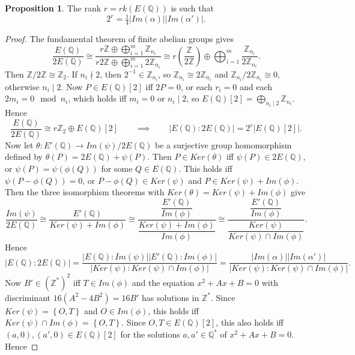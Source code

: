 \documentclass{article}
\newcommand{\Z}{\mathbb{Z}}
\newcommand{\Q}{\mathbb{Q}}
\newcommand{\rb}[1]{\left( #1 \right)}
\renewcommand{\sb}[1]{\left[ #1 \right]}
\newcommand{\cb}[1]{\left\{ #1 \right\}}
\newcommand{\abs}[1]{\left\lvert #1 \right\rvert}
\theoremstyle{definition}\newtheorem*{definition}{Definition}
\theoremstyle{definition}\newtheorem*{example}{Example}
\theoremstyle{definition}\newtheorem*{remark}{Remark}
\newtheorem{proposition}{Proposition}[subsection]
\begin{document}
\begin{proposition}
The rank $ r = rk\rb{E\rb{\Q}} $ is such that
$$ 2^r = \tfrac{1}{4}\abs{Im\rb{\alpha}}\abs{Im\rb{\alpha'}}. $$
\end{proposition}

\begin{proof}
The fundamental theorem of finite abelian groups gives
$$ \dfrac{E\rb{\Q}}{2E\rb{\Q}} \cong \dfrac{r\Z \oplus \bigoplus_{i = 1}^m \Z_{n_i}}{r2\Z \oplus \bigoplus_{i = 1}^m 2\Z_{n_i}} \cong r\rb{\dfrac{\Z}{2\Z}} \oplus \bigoplus_{i = 1}^m \dfrac{\Z_{n_i}}{2\Z_{n_i}}. $$
Then $ \Z / 2\Z \cong \Z_2 $. If $ n_i \nmid 2 $, then $ 2^{-1} \in \Z_{n_i} $, so $ \Z_{n_i} \cong 2\Z_{n_i} $ and $ \Z_{n_i} / 2\Z_{n_i} \cong 0 $, otherwise $ n_i \mid 2 $. Now $ P \in E\rb{\Q}\sb{2} $ iff $ 2P = 0 $, or each $ r_i = 0 $ and each $ 2m_i = 0 \mod n_i $, which holds iff $ m_i = 0 $ or $ n_i \mid 2 $, so $ E\rb{\Q}\sb{2} = \bigoplus_{n_i \mid 2} \Z_{n_i} $. Hence
$$ \dfrac{E\rb{\Q}}{2E\rb{\Q}} \cong r\Z_2 \oplus E\rb{\Q}\sb{2} \qquad \implies \qquad \abs{E\rb{\Q} : 2E\rb{\Q}} = 2^r\abs{E\rb{\Q}\sb{2}}. $$
Now let $ \theta : E'\rb{\Q} \to Im\rb{\psi} / 2E\rb{\Q} $ be a surjective group homomorphism defined by $ \theta\rb{P} = 2E\rb{\Q} + \psi\rb{P} $. Then $ P \in Ker\rb{\theta} $ iff $ \psi\rb{P} \in 2E\rb{\Q} $, or $ \psi\rb{P} = \psi\rb{\phi\rb{Q}} $ for some $ Q \in E\rb{\Q} $. This holds iff $ \psi\rb{P - \phi\rb{Q}} = 0 $, or $ P - \phi\rb{Q} \in Ker\rb{\psi} $ and $ P \in Ker\rb{\psi} + Im\rb{\phi} $. Then the three isomorphism theorems with $ Ker\rb{\theta} = Ker\rb{\psi} + Im\rb{\phi} $ give
$$ \dfrac{Im\rb{\psi}}{2E\rb{\Q}} \cong \dfrac{E'\rb{\Q}}{Ker\rb{\psi} + Im\rb{\phi}} \cong \dfrac{\dfrac{E'\rb{\Q}}{Im\rb{\phi}}}{\dfrac{Ker\rb{\psi} + Im\rb{\phi}}{Im\rb{\phi}}} \cong \dfrac{\dfrac{E'\rb{\Q}}{Im\rb{\phi}}}{\dfrac{Ker\rb{\psi}}{Ker\rb{\psi} \cap Im\rb{\phi}}}. $$
Hence
$$ \abs{E\rb{\Q} : 2E\rb{\Q}} = \dfrac{\abs{E\rb{\Q} : Im\rb{\psi}}\abs{E'\rb{\Q} : Im\rb{\phi}}}{\abs{Ker\rb{\psi} : Ker\rb{\psi} \cap Im\rb{\phi}}} = \dfrac{\abs{Im\rb{\alpha}}\abs{Im\rb{\alpha'}}}{\abs{Ker\rb{\psi} : Ker\rb{\psi} \cap Im\rb{\phi}}}. $$
Now $ B' \in \rb{\Z^*}^2 $ iff $ T \in Im\rb{\phi} $ and the equation $ x^2 + Ax + B = 0 $ with discriminant $ 16\rb{A^2 - 4B^2} = 16B' $ has solutions in $ \Z^* $. Since $ Ker\rb{\psi} = \cb{O, T} $ and $ O \in Im\rb{\phi} $, this holds iff $ Ker\rb{\psi} \cap Im\rb{\phi} = \cb{O, T} $. Since $ O, T \in E\rb{\Q}\sb{2} $, this also holds iff $ \rb{a, 0}, \rb{a', 0} \in E\rb{\Q}\sb{2} $ for the solutions $ a, a' \in \Q^* $ of $ x^2 + Ax + B = 0 $. Hence

\end{proof}
\end{document}

